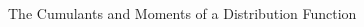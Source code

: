 \begin{slide}{The Cumulants and Moments of a Distribution Function}
\begin{cenpage}{135mm}
  \end{cenpage}
\end{slide}

